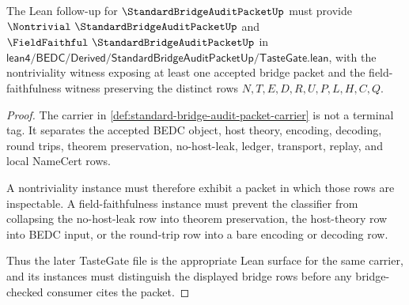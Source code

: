 \begin{theorem}
\label{thm:standard-bridge-audit-packet-tastegate-obligation}
The Lean follow-up for $\StandardBridgeAuditPacketUp$ must provide $\Nontrivial\ \StandardBridgeAuditPacketUp$ and $\FieldFaithful\ \StandardBridgeAuditPacketUp$ in $\mathsf{lean4/BEDC/Derived/StandardBridgeAuditPacketUp/TasteGate.lean}$, with the nontriviality witness exposing at least one accepted bridge packet and the field-faithfulness witness preserving the distinct rows $N,T,E,D,R,U,P,L,H,C,Q$.
\end{theorem}
\begin{proof}
The carrier in \autoref{def:standard-bridge-audit-packet-carrier} is not a terminal tag. It separates the accepted BEDC object, host theory, encoding, decoding, round trips, theorem preservation, no-host-leak, ledger, transport, replay, and local NameCert rows.

A nontriviality instance must therefore exhibit a packet in which those rows are inspectable. A field-faithfulness instance must prevent the classifier from collapsing the no-host-leak row into theorem preservation, the host-theory row into BEDC input, or the round-trip row into a bare encoding or decoding row.

Thus the later TasteGate file is the appropriate Lean surface for the same carrier, and its instances must distinguish the displayed bridge rows before any bridge-checked consumer cites the packet.
\end{proof}


